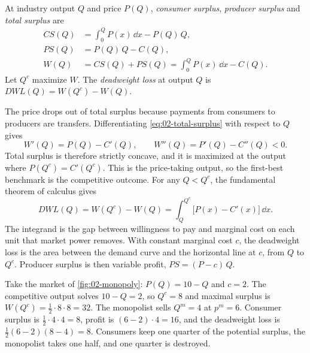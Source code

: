 \begin{definition}\label{def:02-surplus}
At industry output $Q$ and price $P(Q)$, \emph{consumer surplus}, \emph{producer surplus} and \emph{total surplus}
are
\begin{align}
CS(Q) &= \int_0^{Q} P(x)\,\dd x - P(Q)\,Q, \label{eq:02-cs}\\
PS(Q) &= P(Q)\,Q - C(Q), \label{eq:02-ps}\\
W(Q)  &= CS(Q) + PS(Q) = \int_0^{Q} P(x)\,\dd x - C(Q). \label{eq:02-total-surplus}
\end{align}
Let $Q^c$ maximize $W$. The \emph{deadweight loss} at output $Q$ is $\mathit{DWL}(Q) = W(Q^c) - W(Q)$.
\end{definition}

The price drops out of total surplus because payments from consumers to producers are transfers. Differentiating
\eqref{eq:02-total-surplus} with respect to $Q$ gives
\begin{equation*}
W'(Q) = P(Q) - C'(Q), \qquad W''(Q) = P'(Q) - C''(Q) < 0 .
\end{equation*}
Total surplus is therefore strictly concave, and it is maximized at the output where $P(Q^c) = C'(Q^c)$. This is
the price-taking output, so the first-best benchmark is the competitive outcome. For any $Q < Q^c$, the fundamental
theorem of calculus gives
\begin{equation}\label{eq:02-dwl-general}
\mathit{DWL}(Q) = W(Q^c) - W(Q) = \int_{Q}^{Q^c} \bigl[P(x) - C'(x)\bigr]\,\dd x .
\end{equation}
The integrand is the gap between willingness to pay and marginal cost on each unit that market power removes. With
constant marginal cost $c$, the deadweight loss is the area between the demand curve and the horizontal line at
$c$, from $Q$ to $Q^c$. Producer surplus is then variable profit, $PS = (P - c)\,Q$.

\begin{example}\label{ex:02-welfare-monopoly}
Take the market of \cref{fig:02-monopoly}: $P(Q) = 10 - Q$ and $c = 2$. The competitive output solves
$10 - Q = 2$, so $Q^c = 8$ and maximal surplus is $W(Q^c) = \frac{1}{2}\cdot 8 \cdot 8 = 32$. The monopolist sells
$Q^m = 4$ at $p^m = 6$. Consumer surplus is $\frac{1}{2}\cdot 4 \cdot 4 = 8$, profit is $(6 - 2)\cdot 4 = 16$, and
the deadweight loss is $\frac{1}{2}(6 - 2)(8 - 4) = 8$. Consumers keep one quarter of the potential surplus, the
monopolist takes one half, and one quarter is destroyed.
\end{example}

